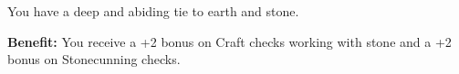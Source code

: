 
You have a deep and abiding tie to earth and stone.

\textbf{Benefit:} You receive a +2 bonus on Craft checks working with stone and a +2 bonus on Stonecunning checks.